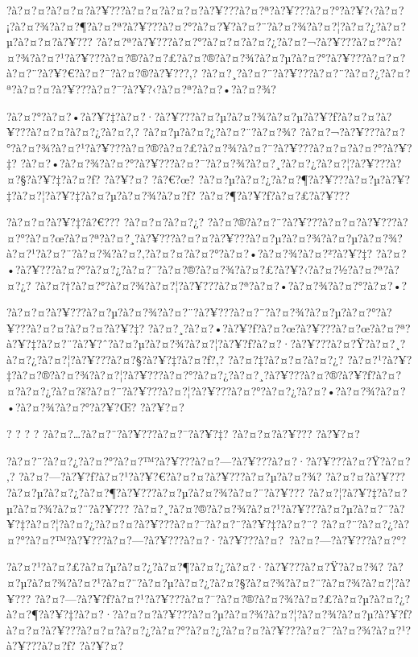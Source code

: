 \documentclass[11pt, openany]{book}
\begin{document}
{{{{{{{{{{?à?¤?¤?à?¤?¤?à?¥???à?¤?¤?à?¤?¤?à?¥???à?¤?ª?à?¥???à?¤?°?à?¥?‹?à?¤?¡?à?¤?¾?à?¤?¶?à?¤?ª?à?¥???à?¤?°?à?¤?¥?à?¤?¨?à?¤?¾?à?¤?¦?à?¤?¿?à?¤?µ?à?¤?¤?à?¥???
?à?¤?ª?à?¥???à?¤?°?à?¤?¤?à?¤?¿?à?¤?¬?à?¥???à?¤?°?à?¤?¾?à?¤?¹?à?¥???à?¤?®?à?¤?£?à?¤?®?à?¤?¾?à?¤?µ?à?¤?°?à?¥???à?¤?¤?à?¤?¨?à?¥?€?à?¤?¯?à?¤?®?à?¥???,?
?à?¤?¸?à?¤?¨?à?¥???à?¤?¨?à?¤?¿?à?¤?ª?à?¤?¤?à?¥???à?¤?¯?à?¥?‹?à?¤?ª?à?¤?•?à?¤?¾?

?à?¤?°?à?¤?•?à?¥?‡?à?¤?·?à?¥???à?¤?µ?à?¤?¾?à?¤?µ?à?¥?ƒ?à?¤?¤?à?¥???à?¤?¤?à?¤?¿?à?¤?‚?
?à?¤?µ?à?¤?¿?à?¤?¨?à?¤?¾?
?à?¤?¬?à?¥???à?¤?°?à?¤?¾?à?¤?¹?à?¥???à?¤?®?à?¤?£?à?¤?¾?à?¤?¨?à?¥???à?¤?¤?à?¤?°?à?¥?‡?
?à?¤?•?à?¤?¾?à?¤?°?à?¥???à?¤?¯?à?¤?¾?à?¤?¸?à?¤?¿?à?¤?¦?à?¥???à?¤?§?à?¥?‡?à?¤?ƒ?
?à?¥?¤? ?â?€?œ?
?à?¤?µ?à?¤?¿?à?¤?¶?à?¥???à?¤?µ?à?¥?‡?à?¤?¦?à?¥?‡?à?¤?µ?à?¤?¾?à?¤?ƒ?
?à?¤?¶?à?¥?ƒ?à?¤?£?à?¥???

?à?¤?¤?à?¥?‡?â?€??? ?à?¤?¤?à?¤?¿?
?à?¤?®?à?¤?¨?à?¥???à?¤?¤?à?¥???à?¤?°?à?¤?œ?à?¤?ª?à?¤?¸?à?¥???à?¤?¤?à?¥???à?¤?µ?à?¤?¾?à?¤?µ?à?¤?¾?à?¤?¹?à?¤?¨?à?¤?¾?à?¤?‚?à?¤?¤?à?¤?°?à?¤?•?à?¤?¾?à?¤?²?à?¥?‡?
?à?¤?•?à?¥???à?¤?°?à?¤?¿?à?¤?¯?à?¤?®?à?¤?¾?à?¤?£?à?¥?‹?à?¤?½?à?¤?ª?à?¤?¿?
?à?¤?†?à?¤?°?à?¤?¾?à?¤?¦?à?¥???à?¤?ª?à?¤?•?à?¤?¾?à?¤?°?à?¤?•?

?à?¤?¤?à?¥???à?¤?µ?à?¤?¾?à?¤?¨?à?¥???à?¤?¨?à?¤?¾?à?¤?µ?à?¤?°?à?¥???à?¤?¤?à?¤?¤?à?¥?‡?
?à?¤?¸?à?¤?•?à?¥?ƒ?à?¤?œ?à?¥???à?¤?œ?à?¤?ª?à?¥?‡?à?¤?¨?à?¥?ˆ?à?¤?µ?à?¤?¾?à?¤?¦?à?¥?ƒ?à?¤?·?à?¥???à?¤?Ÿ?à?¤?¸?à?¤?¿?à?¤?¦?à?¥???à?¤?§?à?¥?‡?à?¤?ƒ?,?
?à?¤?‡?à?¤?¤?à?¤?¿?
?à?¤?¹?à?¥?‡?à?¤?®?à?¤?¾?à?¤?¦?à?¥???à?¤?°?à?¤?¿?à?¤?¸?à?¥???à?¤?®?à?¥?ƒ?à?¤?¤?à?¤?¿?à?¤?š?à?¤?¨?à?¥???à?¤?¦?à?¥???à?¤?°?à?¤?¿?à?¤?•?à?¤?¾?à?¤?•?à?¤?¾?à?¤?°?à?¥?Œ?
?à?¥?¤?

? ? ? ? ?à?¤?\ldots{}?à?¤?¨?à?¥???à?¤?¯?à?¥?‡? ?à?¤?¤?à?¥??? ?à?¥?¤?

?à?¤?¨?à?¤?¿?à?¤?°?à?¤?™?à?¥???à?¤?---?à?¥???à?¤?·?à?¥???à?¤?Ÿ?à?¤?‚?
?à?¤?---?à?¥?ƒ?à?¤?¹?à?¥?€?à?¤?¤?à?¥???à?¤?µ?à?¤?¾? ?à?¤?¤?à?¥???
?à?¤?µ?à?¤?¿?à?¤?¶?à?¥???à?¤?µ?à?¤?¾?à?¤?¨?à?¥???
?à?¤?¦?à?¥?‡?à?¤?µ?à?¤?¾?à?¤?¨?à?¥???
?à?¤?¸?à?¤?®?à?¤?¾?à?¤?¹?à?¥???à?¤?µ?à?¤?¯?à?¥?‡?à?¤?¦?à?¤?¿?à?¤?¤?à?¥???à?¤?¯?à?¤?¨?à?¥?‡?à?¤?¨?
?à?¤?¨?à?¤?¿?à?¤?°?à?¤?™?à?¥???à?¤?---?à?¥???à?¤?·?à?¥???à?¤?~?à?¤?---?à?¥???à?¤?°?

?à?¤?¹?à?¤?£?à?¤?µ?à?¤?¿?à?¤?¶?à?¤?¿?à?¤?·?à?¥???à?¤?Ÿ?à?¤?¾?
?à?¤?µ?à?¤?¾?à?¤?¹?à?¤?¨?à?¤?µ?à?¤?¿?à?¤?§?à?¤?¾?à?¤?¨?à?¤?¾?à?¤?¦?à?¥???
?à?¤?---?à?¥?ƒ?à?¤?¹?à?¥???à?¤?¯?à?¤?®?à?¤?¾?à?¤?£?à?¤?µ?à?¤?¿?à?¤?¶?à?¥?‡?à?¤?·?à?¤?¤?à?¥???à?¤?µ?à?¤?¾?à?¤?¦?à?¤?¾?à?¤?µ?à?¥?ƒ?à?¤?¤?à?¥???à?¤?¤?à?¤?¿?à?¤?°?à?¤?¿?à?¤?¤?à?¥???à?¤?¯?à?¤?¾?à?¤?¹?à?¥???à?¤?ƒ?
?à?¥?¤?

}}}}}}}}}}
\end{document}
